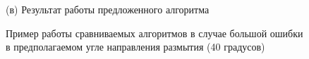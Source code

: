 \begin{figure}[H]
\begin{minipage}[t]{0.3\linewidth}
(в) Результат работы предложенного алгоритма\\ 
\end{minipage}
\caption{ Пример работы сравниваемых алгоритмов в случае большой ошибки в предполагаемом угле направления размытия (40 градусов) }
\label{ris:Wrong_angle}
\end{figure}


